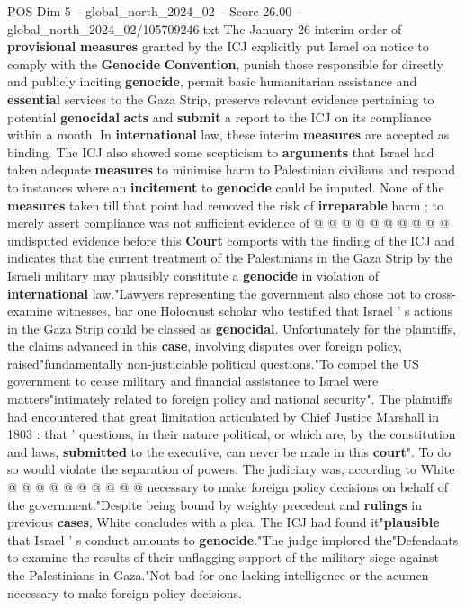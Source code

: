 \begin{textsample}{POS Dim 5 – global\_north\_2024\_02 – Score 26.00 – global\_north\_2024\_02/105709246.txt}
The January 26 interim order of \textbf{provisional} \textbf{measures} granted by the ICJ explicitly put Israel on notice to comply with the \textbf{Genocide} \textbf{Convention}, punish those responsible for directly and publicly inciting \textbf{genocide}, permit basic humanitarian assistance and \textbf{essential} services to the Gaza Strip, preserve relevant evidence pertaining to potential \textbf{genocidal} \textbf{acts} and \textbf{submit} a report to the ICJ on its compliance within a month.
In \textbf{international} law, these interim \textbf{measures} are accepted as binding.
The ICJ also showed some scepticism to \textbf{arguments} that Israel had taken adequate \textbf{measures} to minimise harm to Palestinian civilians and respond to instances where an \textbf{incitement} to \textbf{genocide} could be imputed.
None of the \textbf{measures} taken till that point had removed the risk of \textbf{irreparable} harm ; to merely assert compliance was not sufficient evidence of @ @ @ @ @ @ @ @ @ @ undisputed evidence before this \textbf{Court} comports with the finding of the ICJ and indicates that the current treatment of the Palestinians in the Gaza Strip by the Israeli military may plausibly constitute a \textbf{genocide} in violation of \textbf{international} law."Lawyers representing the government also chose not to cross-examine witnesses, bar one Holocaust scholar who testified that Israel ' s actions in the Gaza Strip could be classed as \textbf{genocidal}.
Unfortunately for the plaintiffs, the claims advanced in this \textbf{case}, involving disputes over foreign policy, raised"fundamentally non-justiciable political questions."To compel the US government to cease military and financial assistance to Israel were matters"intimately related to foreign policy and national security".
The plaintiffs had encountered that great limitation articulated by Chief Justice Marshall in 1803 : that ' questions, in their nature political, or which are, by the constitution and laws, \textbf{submitted} to the executive, can never be made in this \textbf{court}".
To do so would violate the separation of powers.
The judiciary was, according to White @ @ @ @ @ @ @ @ @ @ necessary to make foreign policy decisions on behalf of the government."Despite being bound by weighty precedent and \textbf{rulings} in previous \textbf{cases}, White concludes with a plea.
The ICJ had found it"\textbf{plausible} that Israel ' s conduct amounts to \textbf{genocide}."The judge implored the"Defendants to examine the results of their unflagging support of the military siege against the Palestinians in Gaza."Not bad for one lacking intelligence or the acumen necessary to make foreign policy decisions.

\end{textsample}
